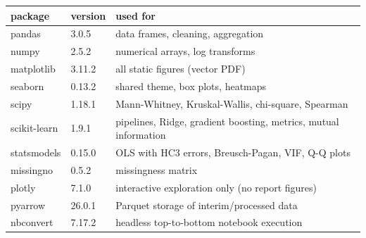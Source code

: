 \begin{tabular}{llp{9cm}}
\toprule
package & version & used for \\
\midrule
pandas & 3.0.5 & data frames, cleaning, aggregation \\
numpy & 2.5.2 & numerical arrays, log transforms \\
matplotlib & 3.11.2 & all static figures (vector PDF) \\
seaborn & 0.13.2 & shared theme, box plots, heatmaps \\
scipy & 1.18.1 & Mann-Whitney, Kruskal-Wallis, chi-square, Spearman \\
scikit-learn & 1.9.1 & pipelines, Ridge, gradient boosting, metrics, mutual information \\
statsmodels & 0.15.0 & OLS with HC3 errors, Breusch-Pagan, VIF, Q-Q plots \\
missingno & 0.5.2 & missingness matrix \\
plotly & 7.1.0 & interactive exploration only (no report figures) \\
pyarrow & 26.0.1 & Parquet storage of interim/processed data \\
nbconvert & 7.17.2 & headless top-to-bottom notebook execution \\
\bottomrule
\end{tabular}
